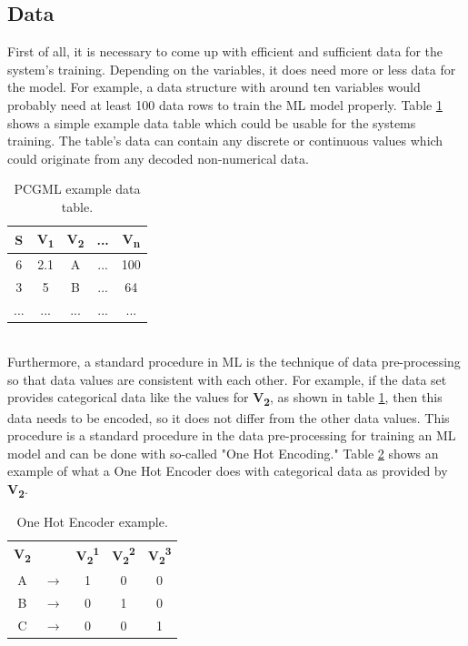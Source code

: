 \documentclass[MGS,Master,english]{twbook}%
\begin{document}
\subsection{Data}
First of all, it is necessary to come up with efficient and sufficient data for the system’s training. Depending on the variables, it does need more or less data for the model. For example, a data structure with around ten variables would probably need at least 100 data rows to train the ML model properly. Table \ref{table::PCGML::devExample::data} shows a simple example data table which could be usable for the systems training. The table’s data can contain any discrete or continuous values which could originate from any decoded non-numerical data.
\begin{table}[!htbp]
	\centering
	\begin{tabular}{|c||c|c|c|c|}
		\hline
		\textbf{S} & \textbf{V\textsubscript{1}} & \textbf{V\textsubscript{2}} & \textbf{...} & \textbf{V\textsubscript{n}} \\ \hline\hline
		6           & 2.1         & A           & ...          & 100         \\ \hline
		3           & 5           & B           & ...          & 64          \\ \hline
		...         & ...         & ...         & ...          & ...         \\ \hline
	\end{tabular}
	\caption{PCGML example data table.}
	\label{table::PCGML::devExample::data}
\end{table}\\
Furthermore, a standard procedure in ML is the technique of data pre-processing so that data values are consistent with each other. For example, if the data set provides categorical data like the values for \textbf{V\textsubscript{2}}, as shown in table \ref{table::PCGML::devExample::data}, then this data needs to be encoded, so it does not differ from the other data values. This procedure is a standard procedure in the data pre-processing for training an ML model and can be done with so-called "One Hot Encoding." Table \ref{table::PCGML::devExample::oneHotEncoder} shows an example of what a One Hot Encoder does with categorical data as provided by \textbf{V\textsubscript{2}}. 
\begin{table}[!htbp]
	\centering
	\begin{tabular}{|c|c|c|c|c|}
		\cline{1-1} \cline{3-5}
		\textbf{V\textsubscript{2}} &  & \textbf{V\textsubscript{2}\textsuperscript{1}} & \textbf{V\textsubscript{2}\textsuperscript{2}} & \textbf{V\textsubscript{2}\textsuperscript{3}} \\ \hhline{=~===}
		A           & $\longrightarrow$         & 1           & 0           & 0           \\ \cline{1-1} \cline{3-5} 
		B           & $\longrightarrow$         & 0           & 1           & 0           \\ \cline{1-1} \cline{3-5} 
		C           & $\longrightarrow$         & 0           & 0           & 1           \\ \cline{1-1} \cline{3-5} 
	\end{tabular}
	\caption{One Hot Encoder example.}
	\label{table::PCGML::devExample::oneHotEncoder}
\end{table}
\end{document}
